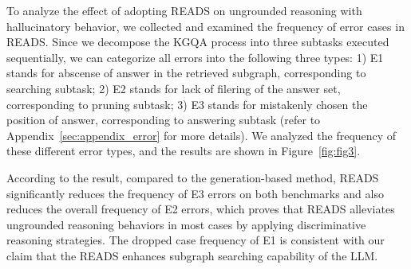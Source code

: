 \documentclass[11pt]{article}
\begin{document}
To analyze the effect of adopting READS on ungrounded reasoning with hallucinatory behavior, we collected and examined the frequency of error cases in READS. Since we decompose the KGQA process into three subtasks executed sequentially, we can categorize all errors into the following three types: 1) E1 stands for abscense of answer in the retrieved subgraph, corresponding to searching subtask; 2) E2 stands for lack of filering of the answer set, corresponding to pruning subtask; 3) E3 stands for mistakenly chosen the position of answer, corresponding to answering subtask (refer to Appendix~\ref{sec:appendix_error} for more details). We analyzed the frequency of these different error types, and the results are shown in Figure~\ref{fig:fig3}.


According to the result, compared to the generation-based method, READS significantly reduces the frequency of E3 errors on both benchmarks and also reduces the overall frequency of E2 errors, which proves that READS alleviates ungrounded reasoning behaviors in most cases by applying discriminative reasoning strategies. The dropped case frequency of E1 is consistent with our claim that the READS enhances subgraph searching capability of the LLM.







\end{document}
